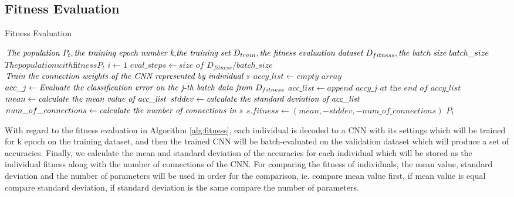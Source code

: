\documentclass[conference]{IEEEtran}
\begin{document}
\subsection{Fitness Evaluation}
\begin{algorithm}
	\caption{Fitness Evaluation}
	\label{alg:fitness}
	\begin{algorithmic}
		\renewcommand{\algorithmicrequire}{\textbf{Input:}}
		\renewcommand{\algorithmicensure}{\textbf{Output:}}
		\REQUIRE $\textit{The population } P_{t}, \newline \textit{the training epoch number k,} \newline \textit{the training set } D_{train}, \newline \textit{the ﬁtness evaluation dataset } D_{fitness}, \newline \textit{the batch size } batch\_size$
		\ENSURE $The population with ﬁtness P_{t}$
			\STATE $i \leftarrow 1$
			\STATE $eval\_steps \leftarrow \textit{size of } D_{fitness} / batch\_size$
				\STATE $\textit{Train the connection weights of the CNN } \newline \textit{represented by individual s}$
					\STATE $accy\_list \leftarrow \textit{empty array}$
						\STATE $acc\_j \leftarrow \textit{Evaluate the classiﬁcation error on } \newline \textit{the j-th batch data from } D_{fitness}$
						\STATE $acc\_list \leftarrow \textit{append accy\_j at the end of accy\_list}$
					\ENDWHILE
					\STATE $mean \leftarrow \textit{calculate the mean value }\newline \textit{of  acc\_list}$
					\STATE $stddev \leftarrow \textit{calculate the standard deviation }\newline \textit{of acc\_list}$
					\STATE $num\_of\_connections \leftarrow \textit{calculate the number }\newline \textit{of connections in s}$
					\STATE $s.fitness \leftarrow (mean, -stddev, -num\_of\_connections)$
				\ENDIF
			\ENDWHILE
		\ENDFOR	
		\RETURN $P_{t}$	
	\end{algorithmic}
\end{algorithm}

With regard to the fitness evaluation in Algorithm \ref{alg:fitness}, each individual is decoded to a CNN with its settings which will be trained for k epoch on the training dataset, and then the trained CNN will be batch-evaluated on the validation dataset which will produce a set of accuracies. Finally, we calculate the mean and standard deviation of the accuracies for each individual which will be stored as the individual fitness along with the number of connections of the CNN. 
For comparing the fitness of individuals, the mean value, standard deviation and the number of parameters will be used in order for the comparison, ie. compare mean value first, if mean value is equal compare standard deviation, if standard deviation is the same compare the number of parameters.
\end{document}
